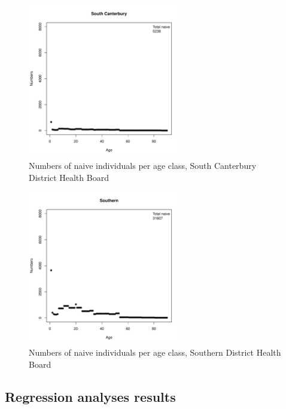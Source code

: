 \documentclass{article}
\begin{document}
\begin{figure}
     \begin{center}
     \includegraphics[width=0.6\textwidth]{dhb19.pdf}
     \end{center}
     \caption{Numbers of naive individuals per age class, South Canterbury District Health Board}
     \label{fig:SouthCanterbury}
\end{figure}

\begin{figure}
     \begin{center}
     \includegraphics[width=0.6\textwidth]{dhb20.pdf}
     \end{center}
     \caption{Numbers of naive individuals per age class, Southern District Health Board}
     \label{fig:Southern}
\end{figure}

\subsection{Regression analyses results}
\label{sub:regression_results}
\end{document}
